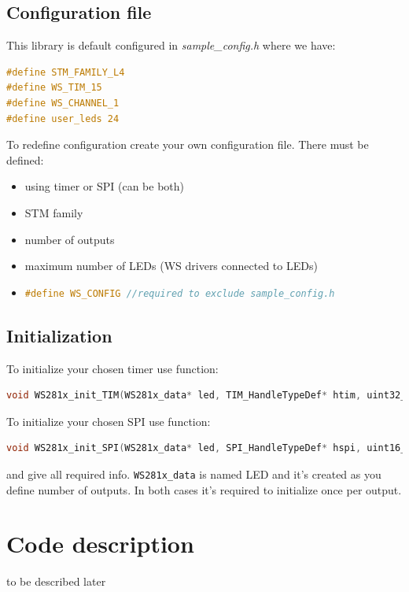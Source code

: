 \documentclass[]{article}
\begin{document}
	\subsection{Configuration file}
	This library is default configured in \textit{sample\_config.h} where we have:
				\begin{lstlisting}[language=C]
#define STM_FAMILY_L4
#define WS_TIM_15
#define WS_CHANNEL_1
#define user_leds 24
\end{lstlisting}
To redefine configuration create your own configuration file. There must be defined:
\begin{itemize}
	\item using timer or SPI (can be both)
	\item STM family
	\item number of outputs
	\item maximum number of LEDs (WS drivers connected to LEDs)
	\item \begin{lstlisting}[language=C]
#define WS_CONFIG //required to exclude sample_config.h \end{lstlisting}
	
\end{itemize} 
\subsection{Initialization}
To initialize your chosen timer use function:
\begin{lstlisting}[language=C]
void WS281x_init_TIM(WS281x_data* led, TIM_HandleTypeDef* htim, uint32_t t_channel, uint16_t led_number	\end{lstlisting}
To initialize your chosen SPI use function:
\begin{lstlisting}[language=C]
void WS281x_init_SPI(WS281x_data* led, SPI_HandleTypeDef* hspi, uint16_t led_number)	\end{lstlisting}
and give all required info. \texttt{WS281x\_data} is named LED and it's created as you define number of outputs. In both cases it's required to initialize once per output.
	\section{Code description}
	to be described later	
\end{document}
